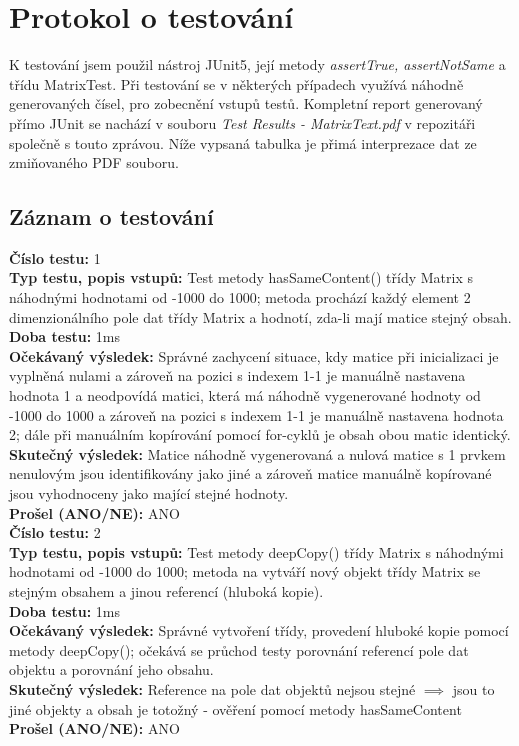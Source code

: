 \documentclass[a4paper,12pt]{article}
\begin{document}
\section{Protokol o testování}
     K testování jsem použil nástroj JUnit5, její metody \textit{assertTrue, assertNotSame} a třídu MatrixTest.
     Při testování se v některých případech využívá náhodně generovaných čísel, pro zobecnění vstupů testů.
     Kompletní report generovaný přímo JUnit se nachází v souboru \textit{Test Results - MatrixText.pdf} v repozitáři
     společně s touto zprávou. Níže vypsaná tabulka je přimá interprezace dat ze zmiňovaného PDF souboru.

\subsection{Záznam o testování}

     \textbf{Číslo testu:} 1\\
     \textbf{Typ testu, popis vstupů:} Test metody hasSameContent() třídy Matrix s náhodnými hodnotami od -1000 do 1000;
     metoda prochází každý element 2 dimenzionálního pole dat třídy Matrix a hodnotí, zda-li mají matice stejný obsah.\\
     \textbf{Doba testu:} 1ms \\
     \textbf{Očekávaný výsledek:} Správné zachycení situace, kdy matice při inicializaci je vyplněná nulami a zároveň
     na pozici s indexem 1-1 je manuálně nastavena hodnota 1 a neodpovídá
     matici, která má náhodně vygenerované hodnoty od -1000 do 1000 a zároveň na pozici s indexem 1-1 je manuálně
     nastavena hodnota 2; dále při manuálním kopírování pomocí for-cyklů je obsah obou matic identický.\\
     \textbf{Skutečný výsledek:} Matice náhodně vygenerovaná a nulová matice s 1 prvkem nenulovým jsou identifikovány
     jako jiné a zároveň matice manuálně kopírované jsou vyhodnoceny jako mající stejné hodnoty.\\
     \textbf{Prošel (ANO/NE):} ANO\\

     \textbf{Číslo testu:} 2\\
     \textbf{Typ testu, popis vstupů:} Test metody deepCopy() třídy Matrix s náhodnými hodnotami od -1000 do 1000;
     metoda na vytváří nový objekt třídy Matrix se stejným obsahem a jinou referencí (hluboká kopie).\\
     \textbf{Doba testu:} 1ms\\
     \textbf{Očekávaný výsledek:} Správné vytvoření třídy, provedení hluboké kopie pomocí metody deepCopy(); očekává se průchod testy porovnání referencí pole dat objektu a porovnání jeho obsahu.\\
     \textbf{Skutečný výsledek:} Reference na pole dat objektů nejsou stejné $\implies$ jsou to jiné objekty a obsah je totožný - ověření pomocí metody hasSameContent\\
     \textbf{Prošel (ANO/NE):} ANO\\
\end{document}
